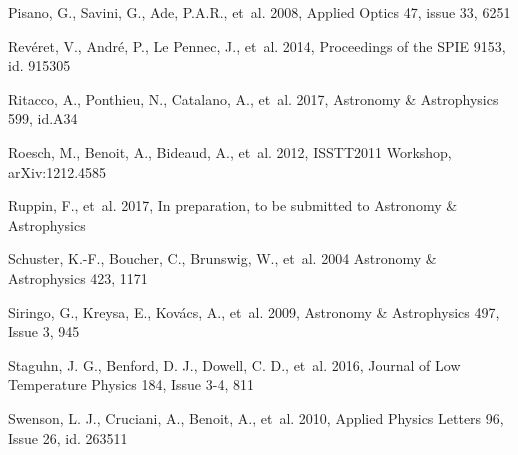 \begin{thebibliography}{99}
Pisano, G., Savini, G., Ade, P.A.R., {et~al.} 2008, 
Applied Optics 47, issue 33, 6251

Rev\'eret, V., Andr\'e, P., Le Pennec, J., {et~al.} 2014, 
Proceedings of the SPIE 9153, id. 915305

Ritacco, A., Ponthieu, N., Catalano, A., {et~al.} 2017, 
Astronomy \& Astrophysics 599, id.A34

Roesch, M., Benoit, A., Bideaud, A., {et~al.} 2012, 
ISSTT2011 Workshop, arXiv:1212.4585

Ruppin, F., {et~al.} 2017, 
In preparation, to be submitted to Astronomy \& Astrophysics

Schuster, K.-F., Boucher, C., Brunswig, W., {et~al.} 2004 
Astronomy \& Astrophysics 423, 1171

Siringo, G., Kreysa, E., Kov\'acs, A., {et~al.} 2009, 
Astronomy \& Astrophysics 497, Issue 3, 945

Staguhn, J. G., Benford, D. J., Dowell, C. D., {et~al.} 2016,
Journal of Low Temperature Physics 184, Issue 3-4, 811

Swenson, L. J., Cruciani, A., Benoit, A., {et~al.} 2010, 
Applied Physics Letters 96, Issue 26, id. 263511

  
  




\end{thebibliography}
